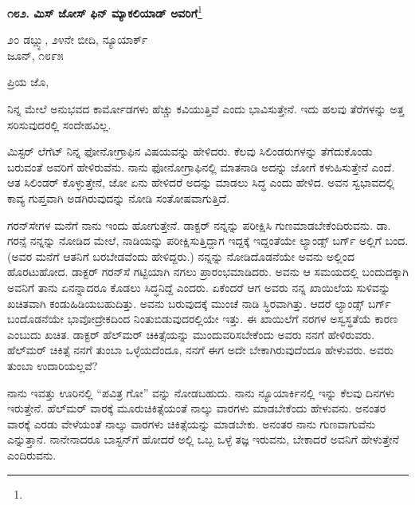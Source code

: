\begin{center}
\textbf{೧೮೨. ಮಿಸ್ ಜೋಸ್ ಫಿನ್ ಮ್ಯಾಕಲಿಯಾಡ್ ಅವರಿಗೆ}\footnote{}
\end{center}

\vspace{-0.5cm}

\begin{flushright}
೨೦ ಡಬ್ಲ್ಯು, ೨೪ನೇ ಬೀದಿ, ನ್ಯೂಯಾರ್ಕ್\\ಜೂನ್, ೧೮೯೫
\end{flushright}

\vspace{-0.3cm}

\noindent
ಪ್ರಿಯ ಜೊ,

ನಿನ್ನ ಮೇಲೆ ಅನುಭವದ ಕಾರ್ಮೋಡಗಳು ಹೆಚ್ಚು ಕವಿಯುತ್ತಿವೆ ಎಂದು ಭಾವಿಸುತ್ತೇನೆ. ಇದು ಹಲವು ತೆರೆಗಳನ್ನು ಅತ್ತ ಸರಿಸುವುದರಲ್ಲಿ ಸಂದೇಹವಿಲ್ಲ.

ಮಿಸ್ಟರ್ ಲೆಗೆಟ್ ನಿನ್ನ ಫೋನೋಗ್ರಾಫಿನ ವಿಷಯವನ್ನು ಹೇಳಿದರು. ಕೆಲವು ಸಿಲಿಂಡರುಗಳನ್ನು ತೆಗೆದುಕೊಂಡು ಬರುವಂತೆ ಅವರಿಗೆ ಹೇಳಿರುವೆನು. ನಾನು ಫೋನೋ\break ಗ್ರಾಫಿನಲ್ಲಿ ಮಾತನಾಡಿ ಅದನ್ನು ಜೋಗೆ ಕಳುಹಿಸುತ್ತೇನೆ ಎಂದೆ. ಆತ ಸಿಲಿಂಡರ್‌ ಕೊಳ್ಳುತ್ತೇನೆ, ಜೋ ಏನು ಹೇಳಿದರೆ ಅದನ್ನು ಮಾಡಲು ಸಿದ್ಧ ಎಂದು ಹೇಳಿದ. ಅವನ ಸ್ವಭಾವದಲ್ಲಿ ಕಾವ್ಯ ಗುಪ್ತವಾಗಿ ಅಡಗಿರುವುದನ್ನು ನೋಡಿ ಸಂತೋಷವಾಗುತ್ತಿದೆ.

ಗರನ್‌ಸೇಗಳ ಮನೆಗೆ ನಾನು ಇಂದು ಹೋಗುತ್ತೇನೆ. ಡಾಕ್ಟರ್ ನನ್ನನ್ನು ಪರೀಕ್ಷಿಸಿ ಗುಣಮಾಡಬೇಕೆಂದಿರುವನು. ಡಾ. ಗರನ್ಸೆ ನನ್ನನ್ನು ನೋಡಿದ ಮೇಲೆ, ನಾಡಿಯನ್ನು ಪರೀಕ್ಷಿಸುತ್ತಿದ್ದಾಗ ಇದ್ದಕ್ಕೆ ಇದ್ದಂತೆಯೇ ಲ್ಯಾಂಡ್ಸ್ ಬರ್ಗ್ ಅಲ್ಲಿಗೆ ಬಂದ. (ಅವರ ಮನೆಗೆ ಆತನಿಗೆ ಬರಬೇಡವೆಂದು ಹೇಳಿದ್ದರು.) ನನ್ನನ್ನು ನೋಡಿದೊಡನೆಯೇ ಅವನು ಅಲ್ಲಿಂದ ಹೊರಟುಹೋದ. ಡಾಕ್ಟರ್‌ ಗರನ್‌ಸೆ ಗಟ್ಟಿಯಾಗಿ ನಗಲು ಪ್ರಾರಂಭಮಾಡಿದರು. ಅವನು ಆ ಸಮಯದಲ್ಲಿ ಬಂದುದಕ್ಕಾಗಿ ಅವನಿಗೆ ತಾನು ಏನನ್ನಾದರೂ ಕೊಡಲು ಸಿದ್ಧನಿದ್ದೆ ಎಂದರು. ಏಕೆಂದರೆ ಆಗ ಅವರು ನನ್ನ ಖಾಯಿಲೆಯ ಸುಳಿವನ್ನು ಖಚಿತವಾಗಿ ಕಂಡುಹಿಡಿಯಬಹುದಿತ್ತು. ಅವನು ಬರುವುದಕ್ಕೆ ಮುಂಚೆ ನಾಡಿ ಸ್ಥಿರವಾಗಿತ್ತು. ಆದರೆ ಲ್ಯಾಂಡ್ಸ್ ಬರ್ಗ್ ಬಂದೊಡನೆಯೇ ಭಾವೋದ್ರೇಕದಿಂದ ನಿಂತುಬಿಡುವುದರಲ್ಲಿಯೇ ಇತ್ತು. ಈ ಖಾಯಿಲೆಗೆ ನರಗಳ ಅಸ್ವಸ್ಥತೆಯೆ  ಕಾರಣ ಎಂಬುದು ಖಚಿತ. ಡಾಕ್ಟರ್ ಹೆಲ್‌ಮರ್‌ ಚಿಕಿತ್ಸೆಯನ್ನು ಮುಂದುವರಿಸಬೇಕೆಂದು ಅವರು ನನಗೆ ಹೇಳಿರುವರು. ಹೆಲ್‌ಮರ್‌ ಚಿಕಿತ್ಸೆ ನನಗೆ ತುಂಬಾ ಒಳ್ಳೆಯದೆಂದೂ, ನನಗೆ ಈಗ ಅದೇ ಬೇಕಾಗಿರುವುದೆಂದೂ ಹೇಳುವರು. ಅವರು ತುಂಬಾ ಉದಾರಿಯಲ್ಲವೆ?

ನಾನು ಇವತ್ತು ಊರಿನಲ್ಲಿ “ಪವಿತ್ರ ಗೋ” ವನ್ನು ನೋಡಬಹುದು. ನಾನು ನ್ಯೂಯಾರ್ಕಿನಲ್ಲಿ ಇನ್ನು ಕೆಲವು ದಿನಗಳು ಇರುತ್ತೇನೆ. ಹೆಲ್‌ಮ‌ರ್ ವಾರಕ್ಕೆ ಮೂರು\break ಚಿಕಿತ್ಸೆಯಂತೆ ನಾಲ್ಕು ವಾರಗಳು ಮಾಡಬೇಕೆಂದು ಹೇಳುವನು. ಅನಂತರ ವಾರಕ್ಕೆ ಎರಡು ವೇಳೆಯಂತೆ ನಾಲ್ಕು ವಾರಗಳು ಚಿಕಿತ್ಸೆಯನ್ನು ಮಾಡಬೇಕು. ಅನಂತರ ನಾನು ಗುಣವಾಗುವೆನು ಎನ್ನುತ್ತಾನೆ. ನಾನೇನಾದರೂ ಬಾಸ್ಟನ್‌ಗೆ ಹೋದರೆ ಅಲ್ಲಿ ಒಬ್ಬ ಒಳ್ಳೆ ತಜ್ಞ  ಇರುವನು, ಬೇಕಾದರೆ ಅವನಿಗೆ ಹೇಳುತ್ತೇನೆ ಎಂದಿರುವನು.

\vspace{0.1cm}

